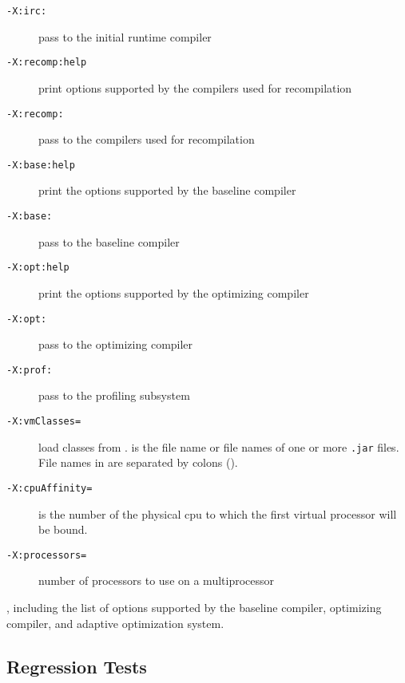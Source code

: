 \begin{description}
\item[{\tt -X:irc:}]
pass  to the initial runtime compiler

\item[{\tt -X:recomp\Mlsq{}:help\Mrsq{}}]
print options supported by the compilers used for recompilation

\item[{\tt -X:recomp:}]
pass  to the compilers used for recompilation

\item[{\tt -X:base\Mlsq{}:help\Mrsq{}}]
print the options supported by the baseline compiler

\item[{\tt -X:base:}]
pass  to the baseline compiler

\item[{\tt -X:opt\Mlsq{}:help\Mrsq{}}]
print the options supported by the optimizing compiler

\item[{\tt -X:opt:}]
pass  to the optimizing compiler

\item[{\tt -X:prof:}]
pass  to the profiling subsystem

\item[{\tt -X:vmClasses=}]
load classes from .   is the file name or
file names of one or more {\tt .jar} files.  File names in
 are separated by colons (\Mlitch{:}).

\item[{\tt -X:cpuAffinity=}]
 is the number of the physical cpu to which the first virtual processor will be bound.

\item[{\tt -X:processors=\Mlsq{}  \Mor{}  \Mrsq{}}]
number of processors to use on a multiprocessor

\end{description}

, including the list of options supported by the baseline
compiler, optimizing compiler, and adaptive optimization system. 

\subsection{Regression Tests}
\label{sec:regression}

